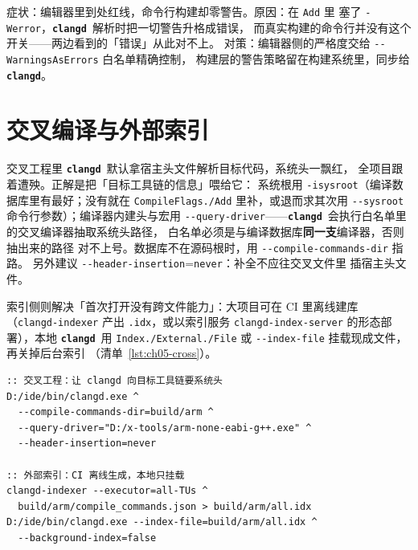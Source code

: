 \documentclass[12pt,a4paper,fontset=fandol]{ctexbook}
\newcommand{\Opt}[1]{\texttt{-\/-#1}}
\newcommand{\Lib}[1]{\textbf{\texttt{#1}}}
\newcommand{\CD}{\Lib{clangd}}
\begin{document}
\begin{warning}[title={别把 \texttt{.clangd} 当编译器配置乱加 \texttt{-Werror}}]
症状：编辑器里到处红线，命令行构建却零警告。原因：在 \texttt{Add} 里
塞了 \texttt{-Werror}，\CD\ 解析时把一切警告升格成错误，
而真实构建的命令行并没有这个开关——两边看到的「错误」从此对不上。
对策：编辑器侧的严格度交给 \Opt{WarningsAsErrors} 白名单精确控制，
构建层的警告策略留在构建系统里，同步给 \CD{}。
\end{warning}

\section{交叉编译与外部索引}\label{sec:ch05-s5}

交叉工程里 \CD\ 默认拿宿主头文件解析目标代码，系统头一飘红，
全项目跟着遭殃。正解是把「目标工具链的信息」喂给它：
系统根用 \texttt{-isysroot}（编译数据库里有最好；没有就在
\texttt{CompileFlags./}\hspace{0pt}\texttt{Add} 里补，或退而求其次用
\Opt{sysroot} 命令行参数）；编译器内建头与宏用
\Opt{query-driver}——\CD\ 会执行白名单里的交叉编译器抽取系统头路径，
白名单必须是与编译数据库\textbf{同一支}编译器，否则抽出来的路径
对不上号。数据库不在源码根时，用 \Opt{compile-commands-dir} 指路。
另外建议 \Opt{header-insertion}=\texttt{never}：补全不应往交叉文件里
插宿主头文件。

索引侧则解决「首次打开没有跨文件能力」：大项目可在 CI 里离线建库
（\texttt{clangd-indexer} 产出 \texttt{.idx}，或以索引服务
\texttt{clangd-index-server} 的形态部署），本地 \CD\ 用
\texttt{Index./}\hspace{0pt}\texttt{External./}\hspace{0pt}\texttt{File}
或 \Opt{index-file} 挂载现成文件，再关掉后台索引
（清单~\ref{lst:ch05-cross}）。

\begin{lstlisting}[style=shellstyle,caption={交叉编译启动参数与外部索引挂载},label={lst:ch05-cross}]
:: 交叉工程：让 clangd 向目标工具链要系统头
D:/ide/bin/clangd.exe ^
  --compile-commands-dir=build/arm ^
  --query-driver="D:/x-tools/arm-none-eabi-g++.exe" ^
  --header-insertion=never

:: 外部索引：CI 离线生成，本地只挂载
clangd-indexer --executor=all-TUs ^
  build/arm/compile_commands.json > build/arm/all.idx
D:/ide/bin/clangd.exe --index-file=build/arm/all.idx ^
  --background-index=false
\end{lstlisting}
\end{document}
